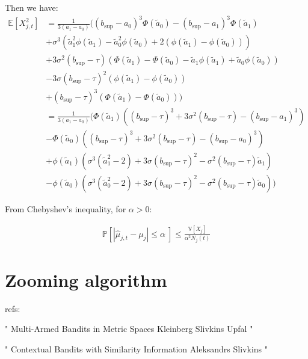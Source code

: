 \documentclass[11pt]{article}
\begin{document}
Then we have:
\begin{align*}
  \mathbb{E}[X_{j,t}^2] &= \frac{1}{3(a_1 - a_0)}\biggl( (b_{\sup}-a_0)^3 \Phi\left(\tilde{a}_0\right) - (b_{\sup}-a_1)^3 \Phi\left(\tilde{a}_1\right)\\
 & + \sigma^3 \left( \tilde{a}_1^2 \phi(\tilde{a}_1) -\tilde{a}_0^2 \phi(\tilde{a}_0) + 2 \left( \phi\left(\tilde{a}_1\right) - \phi\left(\tilde{a}_0\right)\right) \right)\\
 & + 3 \sigma^2 (b_{\sup}- \tau) \left( \Phi\left(\tilde{a}_1\right) -  \Phi\left(\tilde{a}_0\right) - \tilde{a}_1 \phi\left(\tilde{a}_1\right) + \tilde{a}_0 \phi\left(\tilde{a}_0\right)\right)\\
 & - 3 \sigma (b_{\sup}- \tau)^2 \left( \phi\left(\tilde{a}_1\right) - \phi\left(\tilde{a}_0\right)\right)\\
 & +  (b_{\sup}- \tau)^3 \left(\Phi\left(\tilde{a}_1\right) - \Phi\left(\tilde{a}_0\right) \right)\biggr)\\
 & = \frac{1}{3(a_1 - a_0)}\biggl(\Phi\left(\tilde{a}_1\right) \left( (b_{\sup}- \tau)^3 +3 \sigma^2 (b_{\sup}- \tau) - (b_{\sup}-a_1)^3\right)\\
 & - \Phi\left(\tilde{a}_0\right) \left( (b_{\sup}- \tau)^3 +3 \sigma^2 (b_{\sup}- \tau) - (b_{\sup}-a_0)^3\right) \\
 & + \phi\left(\tilde{a}_1\right)\left( \sigma^3 \left(\tilde{a}_1^2 - 2 \right) + 3 \sigma (b_{\sup}- \tau)^2 - \sigma^2 (b_{\sup}- \tau)\tilde{a}_1  \right) \\
 & - \phi\left(\tilde{a}_0\right)\left( \sigma^3 \left(\tilde{a}_0^2 - 2 \right) + 3 \sigma (b_{\sup}- \tau)^2 - \sigma^2 (b_{\sup}- \tau)\tilde{a}_0  \right) \biggr)
\end{align*}

From Chebyshev's inequality, for $\alpha > 0$:

\begin{align*}
  \mathbb{P}\left[\left|\hat{\mu}_{j,t} -\mu_j\right| \leq \alpha \ \right] \leq \frac{\mathbb{V}\left[X_j\right]}{\alpha^2 N_j(t)}
\end{align*}



\section{Zooming algorithm}
refs:

"
Multi-Armed Bandits in Metric Spaces
Kleinberg Slivkins Upfal
"

"
Contextual Bandits with Similarity Information
Aleksandrs Slivkins 
"
\end{document}
